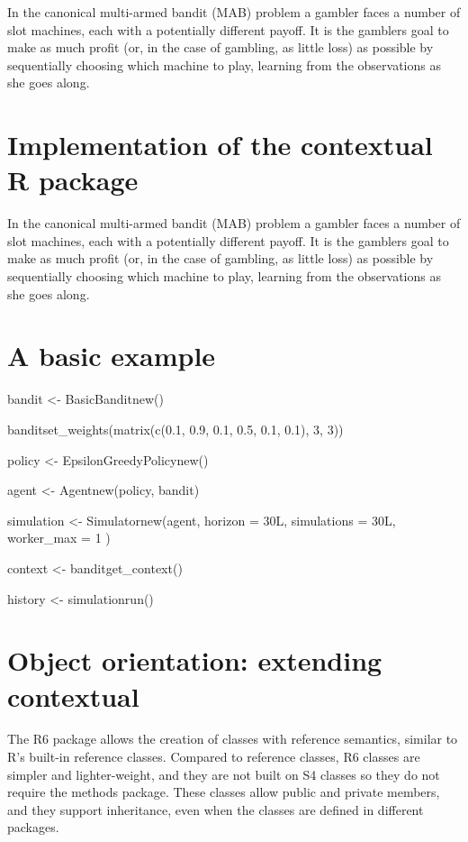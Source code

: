 \documentclass[nojss]{jss}
\begin{document}
In the canonical multi-armed bandit (MAB) problem a gambler faces a number of slot machines, each with a potentially different payoff. It is the gamblers goal to make as much profit (or, in the case of gambling, as little loss) as possible by sequentially choosing which machine to play, learning from the observations as she goes along.

\section{Implementation of the contextual R package}

In the canonical multi-armed bandit (MAB) problem a gambler faces a number of slot machines, each with a potentially different payoff. It is the gamblers goal to make as much profit (or, in the case of gambling, as little loss) as possible by sequentially choosing which machine to play, learning from the observations as she goes along.

\section{A basic example}

bandit      \textless{}- BasicBandit\textdollar{}new()

bandit\textdollar{}set\_weights(matrix(c(0.1, 0.9, 0.1, 0.5, 0.1, 0.1), 3, 3))

policy      \textless{}- EpsilonGreedyPolicy\textdollar{}new()

agent       \textless{}- Agent\textdollar{}new(policy, bandit)

simulation  \textless{}- Simulator\textdollar{}new(agent, horizon = 30L, simulations = 30L, worker\_max = 1 )

context     \textless{}- bandit\textdollar{}get\_context()

history     \textless{}- simulation\textdollar{}run()

\section{Object orientation: extending contextual}

The R6 package allows the creation of classes with reference semantics, similar to R's built-in reference classes. Compared to reference classes, R6 classes are simpler and lighter-weight, and they are not built on S4 classes so they do not require the methods package. These classes allow public and private members, and they support inheritance, even when the classes are defined in different packages.
\end{document}
